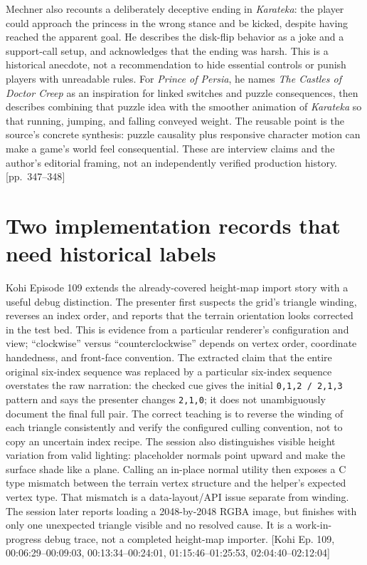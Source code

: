 Mechner also recounts a deliberately deceptive ending in \emph{Karateka}: the player could approach the princess in the wrong stance and be kicked, despite having reached the apparent goal. He describes the disk-flip behavior as a joke and a support-call setup, and acknowledges that the ending was harsh. This is a historical anecdote, not a recommendation to hide essential controls or punish players with unreadable rules. For \emph{Prince of Persia}, he names \emph{The Castles of Doctor Creep} as an inspiration for linked switches and puzzle consequences, then describes combining that puzzle idea with the smoother animation of \emph{Karateka} so that running, jumping, and falling conveyed weight. The reusable point is the source's concrete synthesis: puzzle causality plus responsive character motion can make a game's world feel consequential. These are interview claims and the author's editorial framing, not an independently verified production history. {[}pp.~347--348{]}

\section{Two implementation records that need historical labels}\label{06-engine-ii-ch046-two-implementation-records-that-need-historical-labels}

\hypertarget{06-engine-ii-ch046-two-implementation-records-that-need-historical-labels}{}

Kohi Episode 109 extends the already-covered height-map import story with a useful debug distinction. The presenter first suspects the grid's triangle winding, reverses an index order, and reports that the terrain orientation looks corrected in the test bed. This is evidence from a particular renderer's configuration and view; ``clockwise'' versus ``counterclockwise'' depends on vertex order, coordinate handedness, and front-face convention. The extracted claim that the entire original six-index sequence was replaced by a particular six-index sequence overstates the raw narration: the checked cue gives the initial \texttt{0,1,2\ /\ 2,1,3} pattern and says the presenter changes \texttt{2,1,0}; it does not unambiguously document the final full pair. The correct teaching is to reverse the winding of each triangle consistently and verify the configured culling convention, not to copy an uncertain index recipe. The session also distinguishes visible height variation from valid lighting: placeholder normals point upward and make the surface shade like a plane. Calling an in-place normal utility then exposes a C type mismatch between the terrain vertex structure and the helper's expected vertex type. That mismatch is a data-layout/API issue separate from winding. The session later reports loading a 2048-by-2048 RGBA image, but finishes with only one unexpected triangle visible and no resolved cause. It is a work-in-progress debug trace, not a completed height-map importer. {[}Kohi Ep. 109, 00:06:29--00:09:03, 00:13:34--00:24:01, 01:15:46--01:25:53, 02:04:40--02:12:04{]}


